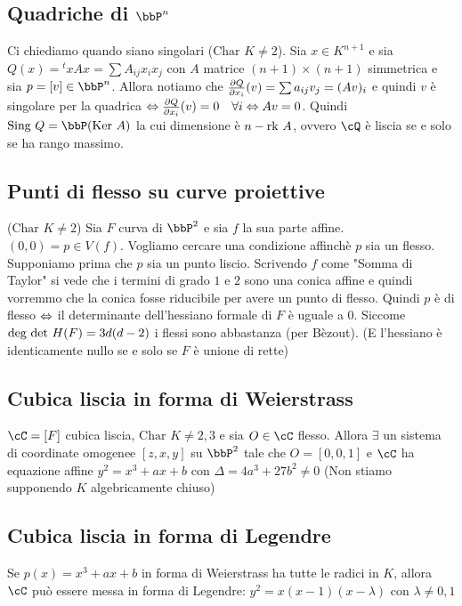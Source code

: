 \documentclass[a4paper,NoNotes,GeneralMath]{stdmdoc}
\newcommand{\Char}{\text{Char }}
\newcommand{\Sing}{\text{Sing }}
\begin{document}
	\subsection*{Quadriche di $\bbP^n$}
	Ci chiediamo quando siano singolari ($\Char K \neq 2$). Sia $x \in K^{n+1}$ e sia $Q(x) = {}^txAx = \sum A_{ij}x_ix_j$ con $A$ matrice $(n+1)\times (n+1)$ simmetrica e sia $p = [v] \in \bbP^n$. Allora notiamo che $\dpar{Q}{x_i}(v) = \sum a_{ij} v_j = (Av)_i$ e quindi $v$ è singolare per la quadrica $\sse \dpar{Q}{x_i}(v) = 0 \quad \forall i \sse Av = 0$. Quindi $\Sing Q = \bbP (\Ker A)$ la cui dimensione è $n - \mbox{rk } A$, ovvero $\cQ$ è liscia se e solo se ha rango massimo.
	
	\subsection*{Punti di flesso su curve proiettive}
	($\Char K \neq 2$) Sia $F$ curva di $\bbP^2$ e sia $f$ la sua parte affine. $(0,0) = p \in V(f)$. Vogliamo cercare una condizione affinchè $p$ sia un flesso. Supponiamo prima che $p$ sia un punto liscio. Scrivendo $f$ come "Somma di Taylor" si vede che i termini di grado $1$ e $2$ sono una conica affine e quindi vorremmo che la conica fosse riducibile per avere un punto di flesso. Quindi $p$ è di flesso $\Leftrightarrow$ il determinante dell'hessiano formale di $F$ è uguale a $0$. Siccome $\mbox{deg } \mbox{det } H(F) = 3d(d-2)$ i flessi sono abbastanza (per Bèzout). (E l'hessiano è identicamente nullo se e solo se $F$ è unione di rette)

	\subsection*{Cubica liscia in forma di Weierstrass}
	$\cC = [F]$ cubica liscia, $\Char K \neq 2,3$ e sia $O \in \cC$ flesso. Allora $\exists$ un sistema di coordinate omogenee $[z, x, y]$ su $\bbP^2$ tale che $O = [0, 0, 1]$ e $\cC$ ha equazione affine $y^2 = x^3 + ax + b$ con $\Delta = 4 a^3 + 27 b^2 \neq 0$ (Non stiamo supponendo $K$ algebricamente chiuso)
	
	\subsection*{Cubica liscia in forma di Legendre}
	Se $p(x) = x^3 + ax + b$ in forma di Weierstrass ha tutte le radici in $K$, allora $\cC$ può essere messa in forma di Legendre: $y^2 = x(x-1)(x-\lambda)$ con $\lambda \neq 0,1$
	
\end{document}
